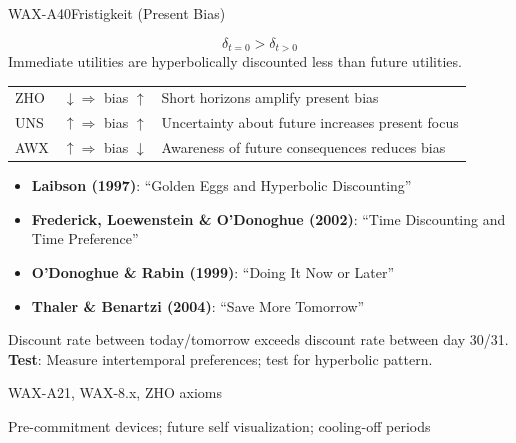 \begin{axiomspec}{WAX-A40}{Fristigkeit (Present Bias)}

\begin{equation}
\delta_{t=0} > \delta_{t>0}
\end{equation}
Immediate utilities are hyperbolically discounted less than future utilities.

\begin{tabular}{lll}
ZHO & $\downarrow \Rightarrow$ bias $\uparrow$ & Short horizons amplify present bias \\
UNS & $\uparrow \Rightarrow$ bias $\uparrow$ & Uncertainty about future increases present focus \\
AWX & $\uparrow \Rightarrow$ bias $\downarrow$ & Awareness of future consequences reduces bias \\
\end{tabular}

\begin{itemize}
\item \textbf{Laibson (1997)}: ``Golden Eggs and Hyperbolic Discounting''
\item \textbf{Frederick, Loewenstein \& O'Donoghue (2002)}: ``Time Discounting and Time Preference''
\item \textbf{O'Donoghue \& Rabin (1999)}: ``Doing It Now or Later''
\item \textbf{Thaler \& Benartzi (2004)}: ``Save More Tomorrow''
\end{itemize}

Discount rate between today/tomorrow exceeds discount rate between day 30/31.
\textbf{Test}: Measure intertemporal preferences; test for hyperbolic pattern.

WAX-A21, WAX-8.x, ZHO axioms

Pre-commitment devices; future self visualization; cooling-off periods

\end{axiomspec}


